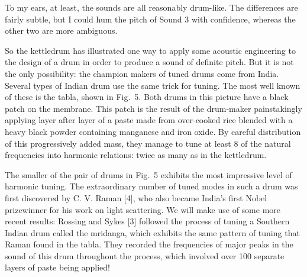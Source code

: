 


  To my ears, at least, the sounds are all reasonably drum-like. The 
  differences are fairly subtle, but I could hum the pitch of Sound 3 with 
  confidence, whereas the other two are more ambiguous. 

  So the kettledrum has illustrated one way to apply some acoustic engineering 
  to the design of a drum in order to produce a sound of definite pitch. But it 
  is not the only possibility: the champion makers of tuned drums come from 
  India. Several types of Indian drum use the same trick for tuning. The most 
  well known of these is the tabla, shown in Fig.\ 5. Both drums in this 
  picture have a black patch on the membrane. This patch is the result of the 
  drum-maker painstakingly applying layer after layer of a paste made from 
  over-cooked rice blended with a heavy black powder containing manganese and 
  iron oxide. By careful distribution of this progressively added mass, they 
  manage to tune at least 8 of the natural frequencies into harmonic relations: 
  twice as many as in the kettledrum. 


  The smaller of the pair of drums in Fig.\ 5 exhibits the most impressive 
  level of harmonic tuning. The extraordinary number of tuned modes in such a 
  drum was first discovered by C. V. Raman [4], who also became India's first 
  Nobel prizewinner for his work on light scattering. We will make use of some 
  more recent results: Rossing and Sykes [3] followed the process of tuning a 
  Southern Indian drum called the mridanga, which exhibits the same pattern of 
  tuning that Raman found in the tabla. They recorded the frequencies of major 
  peaks in the sound of this drum throughout the process, which involved over 
  100 separate layers of paste being applied! 

